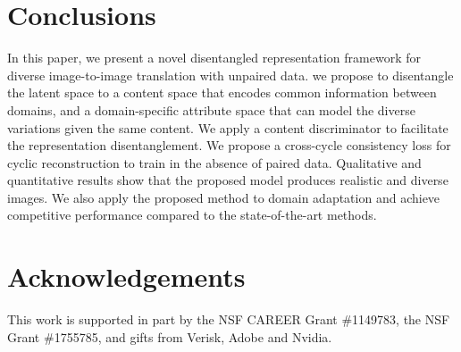 \documentclass[runningheads]{llncs}
\newlength\secmargin
\begin{document}
\section{Conclusions}
\label{sec:conclusion}
\vspace{\secmargin}
In this paper, we present a novel disentangled representation framework for diverse image-to-image translation with unpaired data.
we propose to disentangle the latent space to a content space that encodes common information between domains, and a domain-specific attribute space that can model the diverse variations given the same content.
We apply a content discriminator to facilitate the representation disentanglement.
We propose a cross-cycle consistency loss for cyclic reconstruction to train in the absence of paired data.
Qualitative and quantitative results show that the proposed model produces realistic and diverse images.
We also apply the proposed method to domain adaptation and achieve competitive performance compared to the state-of-the-art methods.
\vspace{-1mm}
\section*{Acknowledgements}
\vspace{-3mm}
This work is supported in part by the NSF CAREER Grant \#1149783, the NSF Grant \#1755785, and gifts from Verisk, Adobe and Nvidia.

\clearpage



\end{document}
